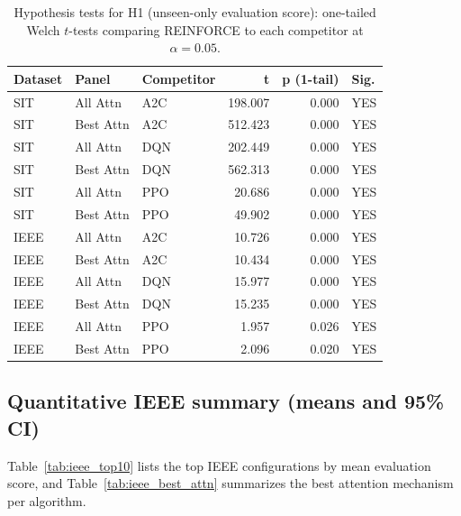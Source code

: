 \documentclass[refree,sn-basic]{sn-jnl} %
\begin{document}
\begin{table}[t]
        \centering
        \caption{Hypothesis tests for H1 (unseen-only evaluation score): one-tailed Welch $t$-tests comparing REINFORCE to each competitor at $\alpha=0.05$.}
        \label{tab:hyp_tests}
        \begin{tabular}{l l l r r l}
        \toprule
        \textbf{Dataset} & \textbf{Panel} & \textbf{Competitor} & \textbf{t} & \textbf{p (1-tail)} & \textbf{Sig.}\\
        \midrule
        SIT & All Attn & A2C & 198.007 & 0.000 & YES\\
        SIT & Best Attn & A2C & 512.423 & 0.000 & YES\\
        SIT & All Attn & DQN & 202.449 & 0.000 & YES\\
        SIT & Best Attn & DQN & 562.313 & 0.000 & YES\\
        SIT & All Attn & PPO & 20.686 & 0.000 & YES\\
        SIT & Best Attn & PPO & 49.902 & 0.000 & YES\\
        IEEE & All Attn & A2C & 10.726 & 0.000 & YES\\
        IEEE & Best Attn & A2C & 10.434 & 0.000 & YES\\
        IEEE & All Attn & DQN & 15.977 & 0.000 & YES\\
        IEEE & Best Attn & DQN & 15.235 & 0.000 & YES\\
        IEEE & All Attn & PPO & 1.957 & 0.026 & YES\\
        IEEE & Best Attn & PPO & 2.096 & 0.020 & YES\\
        \bottomrule
        \end{tabular}
\end{table}

\subsection{Quantitative IEEE summary (means and 95\% CI)}
\label{sec:ieee_summary}
Table~\ref{tab:ieee_top10} lists the top IEEE configurations by mean evaluation score, and Table~\ref{tab:ieee_best_attn} summarizes the best attention mechanism per algorithm.
\end{document}
